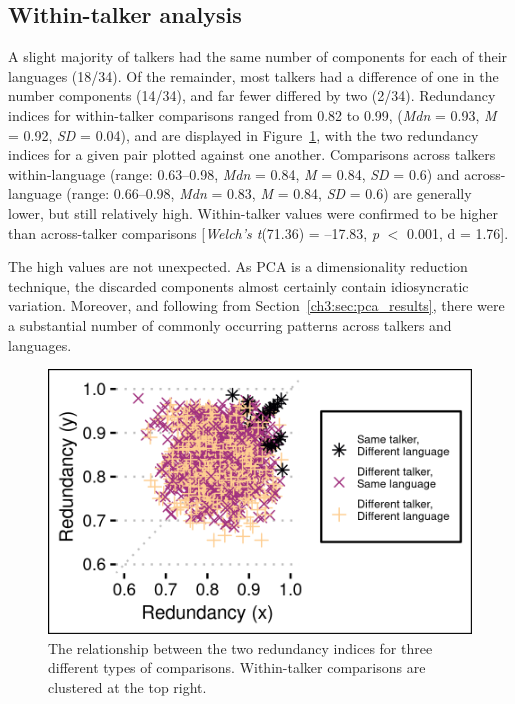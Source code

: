 \subsection{Within-talker analysis} 

A slight majority of talkers had the same number of components for each of their languages (18/34). Of the remainder, most talkers had a difference of one in the number components (14/34), and far fewer differed by two (2/34). Redundancy indices for within-talker comparisons ranged from 0.82 to 0.99, (\textit{Mdn} = 0.93, \textit{M} = 0.92, \textit{SD} = 0.04), and are displayed in Figure~\ref{ch3:fig:redundancy}, with the two redundancy indices for a given pair plotted against one another. Comparisons across talkers within-language (range: 0.63--0.98, \textit{Mdn} = 0.84, \textit{M} = 0.84, \textit{SD} = 0.6) and across-language (range: 0.66--0.98, \textit{Mdn} = 0.83, \textit{M} = 0.84, \textit{SD} = 0.6) are generally lower, but still relatively high. Within-talker values were confirmed to be higher than across-talker comparisons [\textit{Welch's t}(71.36) = --17.83, \textit{p} $<$ 0.001, d = 1.76]. 

The high values are not unexpected. As PCA is a dimensionality reduction technique, the discarded components almost certainly contain idiosyncratic variation. Moreover, and following from Section~\ref{ch3:sec:pca_results}, there were a substantial number of commonly occurring patterns across talkers and languages. 

\begin{figure}[htbp]
\begin{center}
\includegraphics[width=0.875\linewidth]{figures/3-reds_pretty.png} 
\caption{The relationship between the two redundancy indices for three different types of comparisons. Within-talker comparisons are clustered at the top right.}
\label{ch3:fig:redundancy}
\end{center}
\end{figure}

